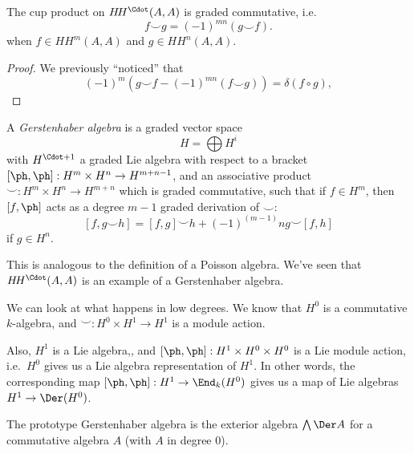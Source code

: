 \documentclass[a4paper]{article}
\newcommand\HH{H\!H}
\begin{document}
\begin{lemma}
  The cup product on $\HH^\Cdot(A, A)$ is graded commutative, i.e.
  \[
    f \smile g = (-1)^{mn} (g \smile f).
  \]
  when $f \in \HH^m(A, A)$ and $g \in \HH^n(A, A)$.
\end{lemma}

\begin{proof}
  We previously ``noticed'' that
  \[
    (-1)^m(g \smile f - (-1)^{mn} (f \smile g)) = \delta (f \circ g),
  \]
\end{proof}

\begin{defi}
  A \emph{Gerstenhaber algebra} is a graded vector space
  \[
    H = \bigoplus H^i
  \]
  with $H^{\Cdot + 1}$ a graded Lie algebra with respect to a bracket $[\ph, \ph]: H^m \times H^n \to H^{m + n - 1}$, and an associative product $\smile: H^m \times H^n \to H^{m + n}$ which is graded commutative, such that if $f \in H^m$, then $[f, \ph]$ acts as a degree $m - 1$ graded derivation of $\smile$:
  \[
    [f, g \smile h] = [f, g] \smile h + (-1)^{(m - 1)}n g \smile [f, h]
  \]
  if $g \in H^n$.
\end{defi}
This is analogous to the definition of a Poisson algebra. We've seen that $\HH^\Cdot(A, A)$ is an example of a Gerstenhaber algebra.

We can look at what happens in low degrees. We know that $H^0$ is a commutative $k$-algebra, and $\smile: H^0 \times H^1 \to H^1$ is a module action.

Also, $H^1$ is a Lie algebra,, and $[\ph, \ph]: H^1 \times H^0 \times H^0$ is a Lie module action, i.e.\ $H^0$ gives us a Lie algebra representation of $H^1$. In other words, the corresponding map $[\ph, \ph]: H^1 \to \End_k(H^0)$ gives us a map of Lie algebras $H^1 \to \Der(H^0)$.

The prototype Gerstenhaber algebra is the exterior algebra $\bigwedge \Der A$ for a commutative algebra $A$ (with $A$ in degree $0$).
\end{document}
